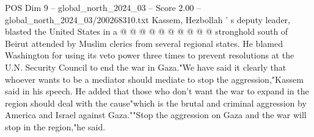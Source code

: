 \begin{textsample}{POS Dim 9 – global\_north\_2024\_03 – Score 2.00 – global\_north\_2024\_03/200268310.txt}
Kassem, Hezbollah ' s deputy leader, blasted the United States in a @ @ @ @ @ @ @ @ @ @ stronghold south of Beirut attended by Muslim clerics from several regional states.
He blamed Washington for using its veto power three times to prevent resolutions at the U.N.
Security Council to end the war in Gaza."We have said it clearly that whoever wants to be a mediator should mediate to stop the aggression,"Kassem said in his speech.
He added that those who don't want the war to expand in the region should deal with the cause"which is the brutal and criminal aggression by America and Israel against Gaza.""Stop the aggression on Gaza and the war will stop in the region,"he said.

\end{textsample}
